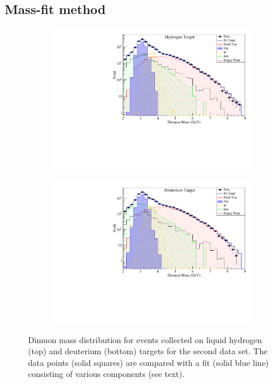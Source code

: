 \documentclass[reprint,aps,unsortedaddress,superscriptaddress,prl,floatfix,showpacs,linenumbers]{revtex4-2}
\begin{document}
\subsection{Mass-fit method}
\begin{figure}[htbp!]
	\centering
	\begin{subfigure}{\linewidth}
		\includegraphics[width=\linewidth]{massfit_run56_LH2.pdf}
	\end{subfigure}
	\begin{subfigure}{\linewidth}
		\includegraphics[width=\linewidth]{massfit_run56_LD2.pdf}
	\end{subfigure}
	\caption{Dimuon mass distribution for events collected
		on liquid hydrogen (top) and deuterium (bottom) targets for the second data set.
		The data points (solid squares) are compared with a fit (solid blue line) consisting of
		various components (see text).}
	\label{fig:massfit}
\end{figure}
\end{document}

